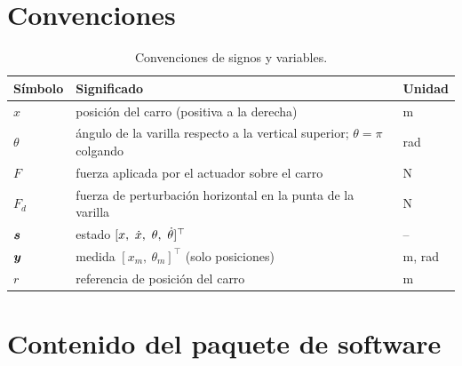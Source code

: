 \section{Convenciones}

\begin{table}[H]
\centering\small
\begin{tabular}{@{}lll@{}}
\toprule
Símbolo & Significado & Unidad\\
\midrule
$x$ & posición del carro (positiva a la derecha) & m\\
$\theta$ & ángulo de la varilla respecto a la vertical superior; $\theta=\pi$ colgando & rad\\
$F$ & fuerza aplicada por el actuador sobre el carro & N\\
$F_d$ & fuerza de perturbación horizontal en la punta de la varilla & N\\
$\bm{s}$ & estado $[x,\ \xd,\ \theta,\ \thd]^\top$ & --\\
$\bm{y}$ & medida $[x_m,\ \theta_m]^\top$ (solo posiciones) & m, rad\\
$r$ & referencia de posición del carro & m\\
\bottomrule
\end{tabular}
\caption{Convenciones de signos y variables.}
\end{table}

\section{Contenido del paquete de software}

